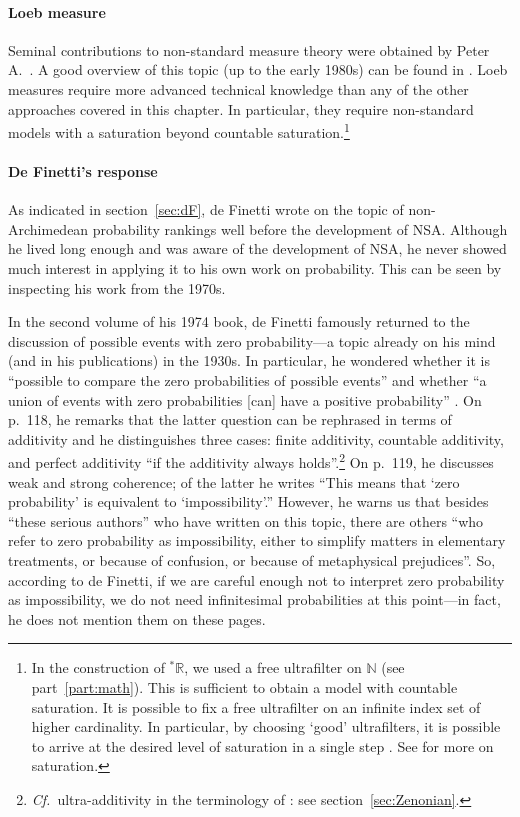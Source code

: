 \paragraph{Loeb measure}
Seminal contributions to non-standard measure theory were obtained by Peter A.~\citet{Loeb:1975}. A good overview of this topic (up to the early 1980s) can be found in \citet{Cutland:1983}. Loeb measures require more advanced technical knowledge than any of the other approaches covered in this chapter. In particular, they require non-standard models with a saturation beyond countable saturation.\footnote{In the construction of ${^\ast\mathbb{R}}$, we used a free ultrafilter on $\mathbb{N}$ (see part~\ref{part:math}). This is sufficient to obtain a model with countable saturation. It is possible to fix a free ultrafilter on an infinite index set of higher cardinality. In particular, by choosing `good' ultrafilters, it is possible to arrive at the desired level of saturation in a single step \citep[section~10]{Keisler:2010}. See \citep[p.~104--108]{HurdLoeb:1985} for more on saturation.}

\paragraph{De Finetti's response\label{sec:dF2}}
As indicated in section~\ref{sec:dF}, de Finetti wrote on the topic of non-Archimedean probability rankings well before the development of NSA. Although he lived long enough and was aware of the development of NSA, he never showed much interest in applying it to his own work on probability. This can be seen by inspecting his work from the 1970s.

In the second volume of his 1974 book, de Finetti famously returned to the discussion of possible events with zero probability---a topic already on his mind (and in his publications) in the 1930s.
In particular, he wondered whether it is ``possible to compare the zero probabilities of possible events'' and whether ``a union of events with zero probabilities [can] have a positive probability'' \citep[Vol.~II, p.~117]{deFinetti:1974}.
On p.~118, he remarks that the latter question can be rephrased in terms of additivity and he distinguishes three cases: finite additivity, countable additivity, and perfect additivity ``if the additivity always holds''.\footnote{\textit{Cf.}\ ultra-additivity in the terminology of \citet{Skyrms:1983a}: see section~\ref{sec:Zenonian}.}
On p.~119, he discusses weak and strong coherence; of the latter he writes ``This means that `zero probability' is equivalent to `impossibility'.'' However, he warns us that besides ``these serious authors'' who have written on this topic, there are others ``who refer to zero probability as impossibility, either to simplify matters in elementary treatments, or because of confusion, or because of metaphysical prejudices''.
So, according to de Finetti, if we are careful enough not to interpret zero probability as impossibility, we do not need infinitesimal probabilities at this point---in fact, he does not mention them on these pages.

